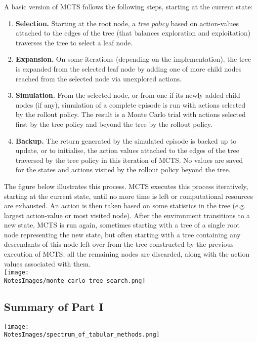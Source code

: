 A basic version of MCTS follows the following steps, starting at the current state:
\begin{enumerate}
    \item {\bfseries{Selection.}} Starting at the root node, a \emph{tree policy} based on action-values attached to the edges of the tree (that balances exploration and exploitation) traverses the tree to select a leaf node. 
    \item {\bfseries{Expansion.}} On some iterations (depending on the implementation), the tree is expanded from the selected leaf node by adding one of more child nodes reached from the selected node via unexplored actions.
    \item {\bfseries{Simulation.}} From the selected node, or from one if its newly added child nodes (if any), simulation of a complete episode is run with actions selected by the rollout policy. The result is a Monte Carlo trial with actions selected first by the tree policy and beyond the tree by the rollout policy.
    \item {\bfseries{Backup.}} The return generated by the simulated episode is backed up to update, or to initialise, the action values attached to the edges of the tree traversed by the tree policy in this iteration of MCTS. No values are saved for the states and actions visited by the rollout policy beyond the tree. 
\end{enumerate}

The figure below illustrates this process. MCTS executes this process iteratively, starting at the current state, until no more time is left or computational resources are exhausted. An action is then taken based on some statistics in the tree (e.g. largest action-value or most visited node). After the environment transitions to a new state, MCTS is run again, sometimes starting with a tree of a single root node representing the new state, but often starting with a tree containing any descendants of this node left over from the tree constructed by the previous execution of MCTS; all the remaining nodes are discarded, along with the action values associated with them.\\

\texttt{[image: \\NotesImages/monte\_carlo\_tree\_search.png]}\\


\subsection*{Summary of Part I}

\texttt{[image: \\NotesImages/spectrum\_of\_tabular\_methods.png]}\\


